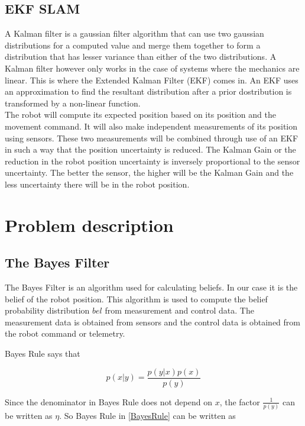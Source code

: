 \documentclass[conference]{IEEEtran}
\begin{document}
\subsection{EKF SLAM}
A Kalman filter is a gaussian filter algorithm that can use two gaussian distributions for a computed value and merge them together to form a distribution that has lesser variance than either of the two distributions. A Kalman filter however only works in the case of systems where the mechanics are linear. This is where the Extended Kalman Filter (EKF) comes in. An EKF uses an approximation to find the resultant distribution after a prior dostribution is transformed by a non-linear function.\\

The robot will compute its expected position based on its position and the movement command. It will also make independent measurements of its position using sensors. These two measurements will be combined through use of an EKF in such a way that the position uncertainty is reduced. The Kalman Gain or the reduction in the robot position uncertainty is inversely proportional to the sensor uncertainty. The better the sensor, the higher will be the Kalman Gain and the less uncertainty there will be in the robot position\cite{stachniss}.

\section{Problem description}
\subsection{The Bayes Filter}

The Bayes Filter is an algorithm used for calculating beliefs\cite{thrun}. In our case it is the belief of the robot position. This algorithm is used to compute the belief probability distribution $bel$ from measurement and control data. The measurement data is obtained from sensors and the control data is obtained from the robot command or telemetry. 

Bayes Rule says that

\begin{equation}\label{BayesRule}
p(x|y) = \frac{p(y|x) p(x)}{p(y)}
\end{equation}

Since the denominator in Bayes Rule does not depend on $x$, the factor $\frac{1}{p(y)}$ can be written as $\eta$. So Bayes Rule in \ref{BayesRule} can be written as
\end{document}
